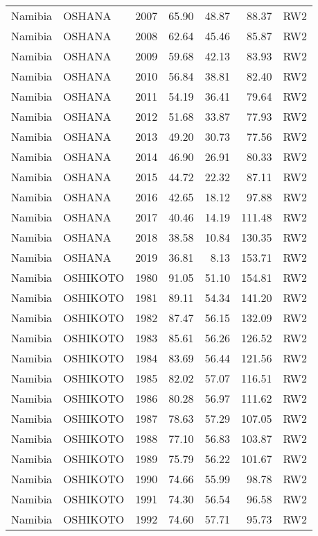 \begin{longtable}{lllrrrl}
  Namibia & OSHANA & 2007 & 65.90 & 48.87 & 88.37 & RW2 \\ 
  Namibia & OSHANA & 2008 & 62.64 & 45.46 & 85.87 & RW2 \\ 
  Namibia & OSHANA & 2009 & 59.68 & 42.13 & 83.93 & RW2 \\ 
  Namibia & OSHANA & 2010 & 56.84 & 38.81 & 82.40 & RW2 \\ 
  Namibia & OSHANA & 2011 & 54.19 & 36.41 & 79.64 & RW2 \\ 
  Namibia & OSHANA & 2012 & 51.68 & 33.87 & 77.93 & RW2 \\ 
  Namibia & OSHANA & 2013 & 49.20 & 30.73 & 77.56 & RW2 \\ 
  Namibia & OSHANA & 2014 & 46.90 & 26.91 & 80.33 & RW2 \\ 
  Namibia & OSHANA & 2015 & 44.72 & 22.32 & 87.11 & RW2 \\ 
  Namibia & OSHANA & 2016 & 42.65 & 18.12 & 97.88 & RW2 \\ 
  Namibia & OSHANA & 2017 & 40.46 & 14.19 & 111.48 & RW2 \\ 
  Namibia & OSHANA & 2018 & 38.58 & 10.84 & 130.35 & RW2 \\ 
  Namibia & OSHANA & 2019 & 36.81 & 8.13 & 153.71 & RW2 \\ 
  Namibia & OSHIKOTO & 1980 & 91.05 & 51.10 & 154.81 & RW2 \\ 
  Namibia & OSHIKOTO & 1981 & 89.11 & 54.34 & 141.20 & RW2 \\ 
  Namibia & OSHIKOTO & 1982 & 87.47 & 56.15 & 132.09 & RW2 \\ 
  Namibia & OSHIKOTO & 1983 & 85.61 & 56.26 & 126.52 & RW2 \\ 
  Namibia & OSHIKOTO & 1984 & 83.69 & 56.44 & 121.56 & RW2 \\ 
  Namibia & OSHIKOTO & 1985 & 82.02 & 57.07 & 116.51 & RW2 \\ 
  Namibia & OSHIKOTO & 1986 & 80.28 & 56.97 & 111.62 & RW2 \\ 
  Namibia & OSHIKOTO & 1987 & 78.63 & 57.29 & 107.05 & RW2 \\ 
  Namibia & OSHIKOTO & 1988 & 77.10 & 56.83 & 103.87 & RW2 \\ 
  Namibia & OSHIKOTO & 1989 & 75.79 & 56.22 & 101.67 & RW2 \\ 
  Namibia & OSHIKOTO & 1990 & 74.66 & 55.99 & 98.78 & RW2 \\ 
  Namibia & OSHIKOTO & 1991 & 74.30 & 56.54 & 96.58 & RW2 \\ 
  Namibia & OSHIKOTO & 1992 & 74.60 & 57.71 & 95.73 & RW2 \\ 

\end{longtable}
